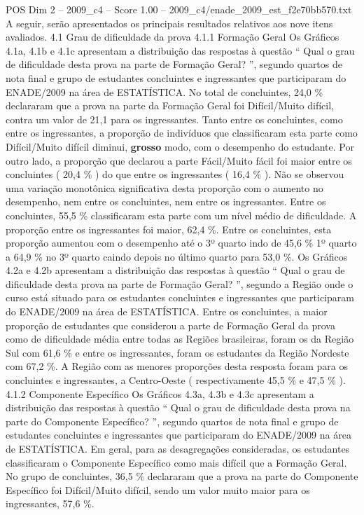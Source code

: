 \begin{textsample}{POS Dim 2 – 2009\_c4 – Score 1.00 – 2009\_c4/enade\_2009\_est\_f2e70bb570.txt}
A seguir, serão apresentados os principais resultados relativos aos nove itens avaliados. 4.1 Grau de dificuldade da prova 4.1.1 Formação Geral Os Gráficos 4.1a, 4.1b e 4.1c apresentam a distribuição das respostas à questão “ Qual o grau de dificuldade desta prova na parte de Formação Geral? ”, segundo quartos de nota final e grupo de estudantes concluintes e ingressantes que participaram do ENADE/2009 na área de ESTATÍSTICA.
No total de concluintes, 24,0 \% declararam que a prova na parte da Formação Geral foi Difícil/Muito difícil, contra um valor de 21,1 para os ingressantes.
Tanto entre os concluintes, como entre os ingressantes, a proporção de indivíduos que classificaram esta parte como Difícil/Muito difícil diminui, \textbf{grosso} modo, com o desempenho do estudante.
Por outro lado, a proporção que declarou a parte Fácil/Muito fácil foi maior entre os concluintes ( 20,4 \% ) do que entre os ingressantes ( 16,4 \% ).
Não se observou uma variação monotônica significativa desta proporção com o aumento no desempenho, nem entre os concluintes, nem entre os ingressantes.
Entre os concluintes, 55,5 \% classificaram esta parte com um nível médio de dificuldade.
A proporção entre os ingressantes foi maior, 62,4 \%.
Entre os concluintes, esta proporção aumentou com o desempenho até o 3º quarto indo de 45,6 \% 1º quarto a 64,9 \% no 3º quarto caindo depois no último quarto para 53,0 \%.
Os Gráficos 4.2a e 4.2b apresentam a distribuição das respostas à questão “ Qual o grau de dificuldade desta prova na parte de Formação Geral? ”, segundo a Região onde o curso está situado para os estudantes concluintes e ingressantes que participaram do ENADE/2009 na área de ESTATÍSTICA.
Entre os concluintes, a maior proporção de estudantes que considerou a parte de Formação Geral da prova como de dificuldade média entre todas as Regiões brasileiras, foram os da Região Sul com 61,6 \% e entre os ingressantes, foram os estudantes da Região Nordeste com 67,2 \%.
A Região com as menores proporções desta resposta foram para os concluintes e ingressantes, a Centro-Oeste ( respectivamente 45,5 \% e 47,5 \% ). 4.1.2 Componente Específico Os Gráficos 4.3a, 4.3b e 4.3c apresentam a distribuição das respostas à questão “ Qual o grau de dificuldade desta prova na parte do Componente Específico? ”, segundo quartos de nota final e grupo de estudantes concluintes e ingressantes que participaram do ENADE/2009 na área de ESTATÍSTICA.
Em geral, para as desagregações consideradas, os estudantes classificaram o Componente Específico como mais difícil que a Formação Geral.
No grupo de concluintes, 36,5 \% declararam que a prova na parte do Componente Específico foi Difícil/Muito difícil, sendo um valor muito maior para os ingressantes, 57,6 \%.

\end{textsample}
